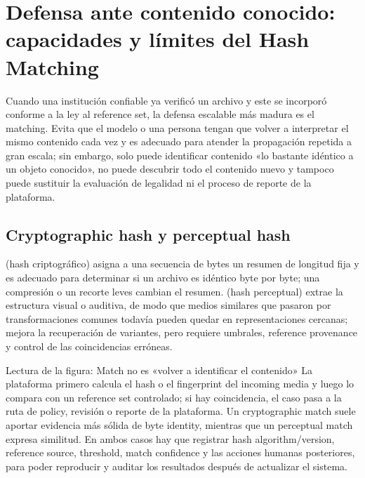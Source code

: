 \section{Defensa ante contenido conocido: capacidades y límites del Hash Matching}

Cuando una institución confiable ya verificó un archivo y este se incorporó conforme a la ley al reference set, la defensa escalable más madura es el matching. Evita que el modelo o una persona tengan que volver a interpretar el mismo contenido cada vez y es adecuado para atender la propagación repetida a gran escala; sin embargo, solo puede identificar contenido «lo bastante idéntico a un objeto conocido», no puede descubrir todo el contenido nuevo y tampoco puede sustituir la evaluación de legalidad ni el proceso de reporte de la plataforma.

\subsection{Cryptographic hash y perceptual hash}

 (hash criptográfico) asigna a una secuencia de bytes un resumen de longitud fija y es adecuado para determinar si un archivo es idéntico byte por byte; una compresión o un recorte leves cambian el resumen.  (hash perceptual) extrae la estructura visual o auditiva, de modo que medios similares que pasaron por transformaciones comunes todavía pueden quedar en representaciones cercanas; mejora la recuperación de variantes, pero requiere umbrales, reference provenance y control de las coincidencias erróneas.


\begin{knowledgebox}{Lectura de la figura: Match no es «volver a identificar el contenido»}
La plataforma primero calcula el hash o el fingerprint del incoming media y luego lo compara con un reference set controlado; si hay coincidencia, el caso pasa a la ruta de policy, revisión o reporte de la plataforma. Un cryptographic match suele aportar evidencia más sólida de byte identity, mientras que un perceptual match expresa similitud. En ambos casos hay que registrar hash algorithm/version, reference source, threshold, match confidence y las acciones humanas posteriores, para poder reproducir y auditar los resultados después de actualizar el sistema.
\end{knowledgebox}

